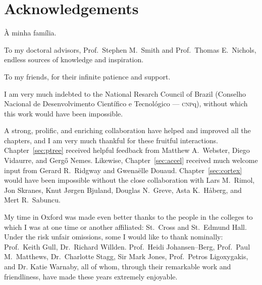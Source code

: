\chapter*{Acknowledgements}
\setstretch{\lspac}

\noindent
\`{A} minha fam\'{i}lia.

\vspace{3mm}\noindent
To my doctoral advisors, Prof.\ Stephen M.\ Smith and Prof.\ Thomas E.\ Nichols, endless sources of knowledge and inspiration.

\vspace{3mm}\noindent
To my friends, for their infinite patience and support.

\vspace{3mm}\noindent
I am very much indebted to the National Resarch Council of Brazil (Conselho Nacional de Desenvolvimento Cient\'{i}fico e Tecnol\'{o}gico --- \textsc{cnp}q), without which this work would have been impossible.

\vspace{3mm}\noindent
A strong, prolific, and enriching collaboration have helped and improved all the chapters, and I am very much thankful for these fruitful interactions. Chapter~\ref{sec:ptree} received helpful feedback from Matthew A.\ Webster, Diego Vidaurre, and Gerg\H{o} Nemes. Likewise, Chapter~\ref{sec:accel} received much welcome input from Gerard R.\ Ridgway and Gwena\"{e}lle Douaud. Chapter~\ref{sec:cortex} would have been impossible without the close collaboration with Lars M.\ Rimol, Jon Skranes, Knut J\o{}rgen Bjuland, Douglas N.\ Greve, Asta K.\ H{\aa}berg, and Mert R.\ Sabuncu.

\vspace{3mm}\noindent
My time in Oxford was made even better thanks to the people in the colleges to which I was at one time or another affiliated: St.\ Cross and St.\ Edmund Hall. Under the risk unfair omissions, some I would like to thank nominally: Prof.\ Keith Gull, Dr.\ Richard Willden. Prof.\ Heidi Johansen--Berg, Prof.\ Paul M.\ Matthews, Dr.\ Charlotte Stagg, Sir Mark Jones, Prof.\ Petros Ligoxygakis, and Dr. Katie Warnaby, all of whom, through their remarkable work and friendliness, have made these years extremely enjoyable.

